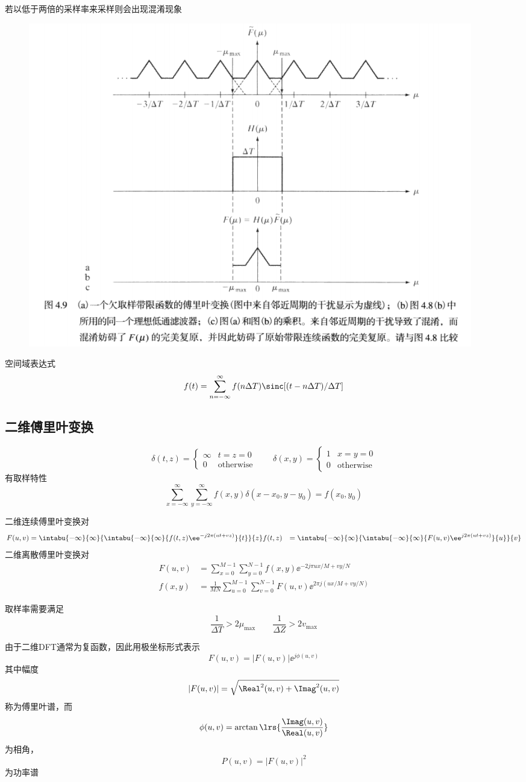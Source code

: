 若以低于两倍的采样率来采样则会出现混淆现象
\begin{figure}[H]
\centering
\includegraphics[width=0.8\linewidth]{fig/nyquist.png}
\end{figure}

空间域表达式
\[f(t)=\sum_{n=-\infty}^{\infty}f(n\Delta T)\sinc[(t-n\Delta T)/\Delta T]\]

\subsection{二维傅里叶变换}
\begin{definition}[二维冲激]
\[\delta(t,z)=\begin{cases}
\infty & t=z=0\\
0 & \text{otherwise}
\end{cases}\qquad
\delta(x,y)=\begin{cases}
1 & x=y=0\\
0 & \text{otherwise}
\end{cases}\]
有取样特性
\[\sum_{x=-\infty}^\infty\sum_{y=-\infty}^\infty f(x,y)\delta(x-x_0,y-y_0)=f(x_0,y_0)\]
\end{definition}
\begin{definition}[二维离散傅里叶变换]
二维连续傅里叶变换对
\[\begin{aligned}
F(u,v)&=\intabu{-\infty}{\infty}{\intabu{-\infty}{\infty}{f(t,z)\ee^{-j2\pi(ut+vz)}}{t}}{z}
f(t,z)&=\intabu{-\infty}{\infty}{\intabu{-\infty}{\infty}{F(u,v)\ee^{j2\pi(ut+vz)}}{u}}{v}
\end{aligned}\]
二维离散傅里叶变换对
\[\begin{aligned}
F(u,v)&=\sum_{x=0}^{M-1}\sum_{y=0}^{N-1}f(x,y)\ee^{-2j\pi ux/M+vy/N}\\
f(x,y)&=\frac{1}{MN}\sum_{u=0}^{M-1}\sum_{v=0}^{N-1}F(u,v)\ee^{2\pi j(ux/M+vy/N)}
\end{aligned}\]
\end{definition}
\begin{theorem}[二维采样定理]
取样率需要满足
\[\frac{1}{\Delta T}>2\mu_{\max}\qquad\frac{1}{\Delta Z}>2v_{\max}\]
\end{theorem}
\begin{definition}[傅里叶谱和相角]
由于二维DFT通常为复函数，因此用极坐标形式表示
\[F(u,v)=|F(u,v)|\ee^{j\phi(u,v)}\]
其中幅度
\[|F(u,v)|=\sqrt{\Real^2(u,v)+\Imag^2(u,v)}\]
称为傅里叶谱，而
\[\phi(u,v)=\arctan\lrs{\frac{\Imag(u,v)}{\Real(u,v)}}\]
为相角，
\[P(u,v)=|F(u,v)|^2\]
为功率谱
\end{definition}

